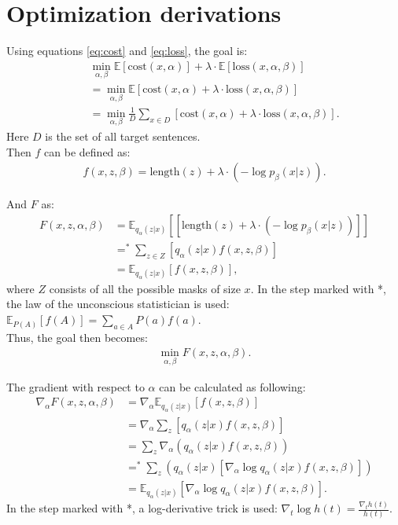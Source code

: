\chapter{Optimization derivations}
\label{app:gradients}
Using equations \ref{eq:cost} and \ref{eq:loss}, the goal is:
\begin{align*}
    \quad & \min_{\alpha, \beta} \mathbb{E} [\text{cost}(x, \alpha)] + \lambda \cdot \mathbb{E}[\text{loss}(x, \alpha, \beta)] \\
    &= \min_{\alpha, \beta} \mathbb{E} [\text{cost}(x, \alpha) + \lambda \cdot \text{loss}(x, \alpha, \beta)] \\
    &= \min_{\alpha, \beta} \frac{1}{D} \sum_{x \in D}[\text{cost}(x, \alpha) + \lambda \cdot \text{loss}(x, \alpha, \beta)].
\end{align*}
Here $D$ is the set of all target sentences. \\

\noindent Then $f$ can be defined as:
\begin{align*}
    f(x, z, \beta) = \text{length}(z) + \lambda \cdot (-\log p_{\beta}(x|z)).
\end{align*}

\noindent And $F$ as:
\begin{align*}
    F(x, z, \alpha, \beta) &= \mathbb{E}_{q_{\alpha}(z|x)} [[\text{length}(z) + \lambda \cdot (-\log p_{\beta}(x|z))]] \\
    &=^{\ast} \sum_{z\in Z} [q_{\alpha}(z|x) f(x, z, \beta)] \\
    &= \mathbb{E}_{q_{\alpha}(z|x)}[f(x, z, \beta)],
\end{align*}
where $Z$ consists of all the possible masks of size $x$.
In the step marked with *, the law of the unconscious statistician is used: $\mathbb{E}_{P(A)}[f(A)] = \sum_{a \in A}P(a)f(a)$. \\

\noindent Thus, the goal then becomes:
\begin{align*}
    \min_{\alpha, \beta} F(x, z, \alpha, \beta).
\end{align*}

\noindent The gradient with respect to $\alpha$ can be calculated as following:
\begin{align*}
    \nabla_{\alpha} F(x, z, \alpha, \beta) &= \nabla_{\alpha} \mathbb{E}_{q_{\alpha}(z|x)} [f(x, z, \beta)] \\
    &= \nabla_{\alpha} \sum_z [q_{\alpha}(z|x) f(x, z, \beta)] \\
    &= \sum_z \nabla_{\alpha} (q_{\alpha}(z|x) f(x, z, \beta)) \\
    &=^\ast \sum_z (q_{\alpha}(z|x) [\nabla_{\alpha} \log q_{\alpha}(z|x) f(x, z, \beta)]) \\
    &= \mathbb{E}_{q_{\alpha}(z|x)} [\nabla_{\alpha} \log q_{\alpha}(z|x) f(x, z, \beta)].
\end{align*}
In the step marked with *, a log-derivative trick is used: $\nabla_t \log h(t) = \frac{\nabla_t h(t)}{h(t)}$. \\

